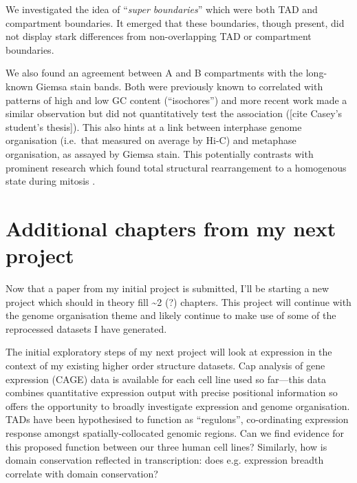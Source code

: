 \documentclass[a4paper,10pt,oneside]{book}
\begin{document}
We investigated the idea of ``\emph{super boundaries}'' which were both
TAD and compartment boundaries. It emerged that these boundaries, though
present, did not display stark differences from non-overlapping TAD or
compartment boundaries.

We also found an agreement between A and B compartments with the
long-known Giemsa stain bands. Both were previously known to correlated
with patterns of high and low GC content (``isochores'') and more recent
work made a similar observation but did not quantitatively test the
association ({[}cite Casey's student's thesis{]}). This also hints at a
link between interphase genome organisation (i.e.~that measured on
average by Hi-C) and metaphase organisation, as assayed by Giemsa stain.
This potentially contrasts with prominent research which found total
structural rearrangement to a homogenous state during mitosis
\cite{Naumova2013}.

\section{Additional chapters from my next
project}\label{additional-chapters-from-my-next-project}

Now that a paper from my initial project is submitted, I'll be starting
a new project which should in theory fill \textasciitilde{}2 (?)
chapters. This project will continue with the genome organisation theme
and likely continue to make use of some of the reprocessed datasets I
have generated.

The initial exploratory steps of my next project will look at
expression in the context of my existing higher order structure
datasets. Cap analysis of gene expression (CAGE) data is available for
each cell line used so far---this data combines quantitative
expression output with precise positional information so offers the
opportunity to broadly investigate expression and genome
organisation. TADs have been hypothesised to function as
``regulons''\cite{LeDily2014}, co-ordinating expression response
amongst spatially-collocated genomic regions. Can we find evidence for
this proposed function between our three human cell lines? Similarly,
how is domain conservation reflected in transcription: does
e.g. expression breadth correlate with domain conservation?
\end{document}
